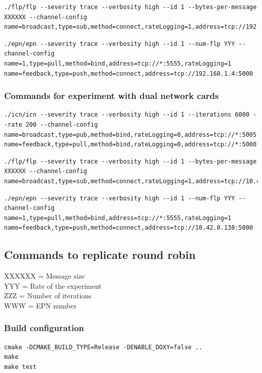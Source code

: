 \documentclass[]{article}
\begin{document}
\begin{lstlisting}
./flp/flp --severity trace --verbosity high --id 1 --bytes-per-message XXXXXX --channel-config name=broadcast,type=sub,method=connect,rateLogging=1,address=tcp://192.168.1.4:5005
\end{lstlisting}

\begin{lstlisting}
./epn/epn --severity trace --verbosity high --id 1 --num-flp YYY --channel-config name=1,type=pull,method=bind,address=tcp://*:5555,rateLogging=1 name=feedback,type=push,method=connect,address=tcp://192.168.1.4:5000
\end{lstlisting}

\subsubsection{Commands for experiment with dual network cards}
\begin{lstlisting}
./icn/icn --severity trace --verbosity high --id 1 --iterations 6000 --rate 200 --channel-config name=broadcast,type=pub,method=bind,rateLogging=0,address=tcp://*:5005 name=feedback,type=pull,method=bind,rateLogging=0,address=tcp://*:5000
\end{lstlisting}

\begin{lstlisting}
./flp/flp --severity trace --verbosity high --id 1 --bytes-per-message XXXXXX --channel-config name=broadcast,type=sub,method=connect,rateLogging=1,address=tcp://10.42.0.138:5005
\end{lstlisting}

\begin{lstlisting}
./epn/epn --severity trace --verbosity high --id 1 --num-flp YYY --channel-config name=1,type=pull,method=bind,address=tcp://*:5555,rateLogging=1 name=feedback,type=push,method=connect,address=tcp://10.42.0.138:5000
\end{lstlisting}

\subsection{Commands to replicate round robin}
\label{sec:appendix02}
XXXXXX = Message size \\
YYY = Rate of the experiment \\
ZZZ = Number of iterations \\
WWW = EPN number

\subsubsection{Build configuration}
\begin{lstlisting}
cmake -DCMAKE_BUILD_TYPE=Release -DENABLE_DOXY=false ..
make 
make test
\end{lstlisting}
\end{document}
